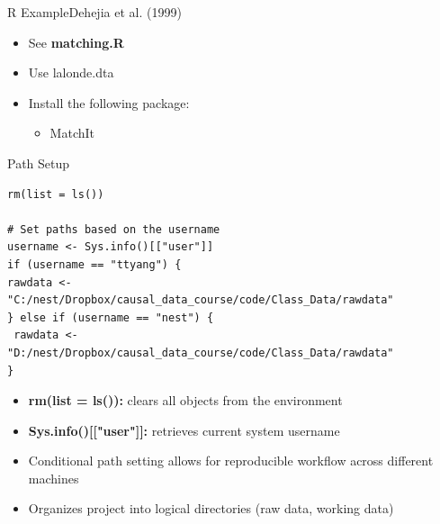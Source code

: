 \documentclass[dvipsnames,hyperref={pdfpagelabels=false}]{beamer}
\begin{document}
\author 
{}

\institute{}

\date
{}

\begin{frame}{}
	\titlepage
\end{frame}


\begin{frame}{R Example}{Dehejia et al. (1999)}
	\begin{itemize}
		\item See \textbf{matching.R}
		\vspace{0.2cm}
		\item Use lalonde.dta
		\vspace{0.2cm}
		\item Install the following package:
		\begin{itemize}
			\vspace{0.2cm}
			\item MatchIt 
		\end{itemize}
		
	\end{itemize}
\end{frame}


\begin{frame}[fragile]{Path Setup}{}
\begin{lstlisting}
rm(list = ls())

# Set paths based on the username
username <- Sys.info()[["user"]]
if (username == "ttyang") {
rawdata <- "C:/nest/Dropbox/causal_data_course/code/Class_Data/rawdata"
} else if (username == "nest") {
 rawdata <- "D:/nest/Dropbox/causal_data_course/code/Class_Data/rawdata"
}
\end{lstlisting}
	\begin{itemize}
		\vspace{0.2cm}
		\item \textbf{rm(list = ls()):} clears all objects from the environment
		\vspace{0.2cm}
		\item \textbf{Sys.info()[["user"]]:} retrieves current system username
		\vspace{0.2cm}
		\item Conditional path setting allows for reproducible workflow across different machines
		\vspace{0.2cm}
		\item Organizes project into logical directories (raw data, working data)
	\end{itemize}
\end{frame}
\end{document}

